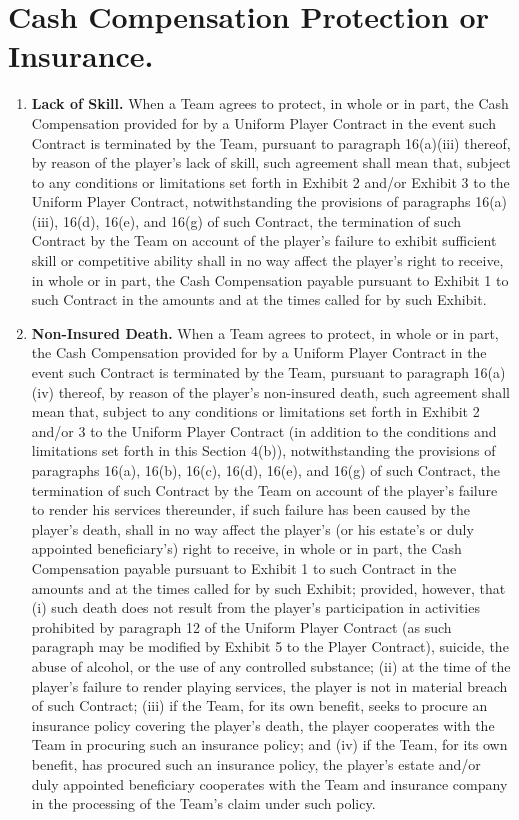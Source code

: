 \documentclass[
]{book}
\providecommand{\tightlist}{%
  \setlength{\itemsep}{0pt}\setlength{\parskip}{0pt}}
\begin{document}
\hypertarget{cash-compensation-protection-or-insurance.}{%
\section{Cash Compensation Protection or Insurance.}\label{cash-compensation-protection-or-insurance.}}

\begin{enumerate}
\def\labelenumi{(\alph{enumi})}
\tightlist
\item
  \textbf{Lack of Skill.} When a Team agrees to protect, in whole or in part, the Cash Compensation provided for by a Uniform Player Contract in the event such Contract is terminated by the Team, pursuant to paragraph 16(a)(iii) thereof, by reason of the player's lack of skill, such agreement shall mean that, subject to any conditions or limitations set forth in Exhibit 2 and/or Exhibit 3 to the Uniform Player Contract, notwithstanding the provisions of paragraphs 16(a)(iii), 16(d), 16(e), and 16(g) of such Contract, the termination of such Contract by the Team on account of the player's failure to exhibit sufficient skill or competitive ability shall in no way affect the player's right to receive, in whole or in part, the Cash Compensation payable pursuant to Exhibit 1 to such Contract in the amounts and at the times called for by such Exhibit.
\item
  \textbf{Non-Insured Death.} When a Team agrees to protect, in whole or in part, the Cash Compensation provided for by a Uniform Player Contract in the event such Contract is terminated by the Team, pursuant to paragraph 16(a)(iv) thereof, by reason of the player's non-insured death, such agreement shall mean that, subject to any conditions or limitations set forth in Exhibit 2 and/or 3 to the Uniform Player Contract (in addition to the conditions and limitations set forth in this Section 4(b)), notwithstanding the provisions of paragraphs 16(a), 16(b), 16(c), 16(d), 16(e), and 16(g) of such Contract, the termination of such Contract by the Team on account of the player's failure to render his services thereunder, if such failure has been caused by the player's death, shall in no way affect the player's (or his estate's or duly appointed beneficiary's) right to receive, in whole or in part, the Cash Compensation payable pursuant to Exhibit 1 to such Contract in the amounts and at the times called for by such Exhibit; provided, however, that (i) such death does not result from the player's participation in activities prohibited by paragraph 12 of the Uniform Player Contract (as such paragraph may be modified by Exhibit 5 to the Player Contract), suicide, the abuse of alcohol, or the use of any controlled substance; (ii) at the time of the player's failure to render playing services, the player is not in material breach of such Contract; (iii) if the Team, for its own benefit, seeks to procure an insurance policy covering the player's death, the player cooperates with the Team in procuring such an insurance policy; and (iv) if the Team, for its own benefit, has procured such an insurance policy, the player's estate and/or duly appointed beneficiary cooperates with the Team and insurance company in the processing of the Team's claim under such policy.

\end{enumerate}
\end{document}
